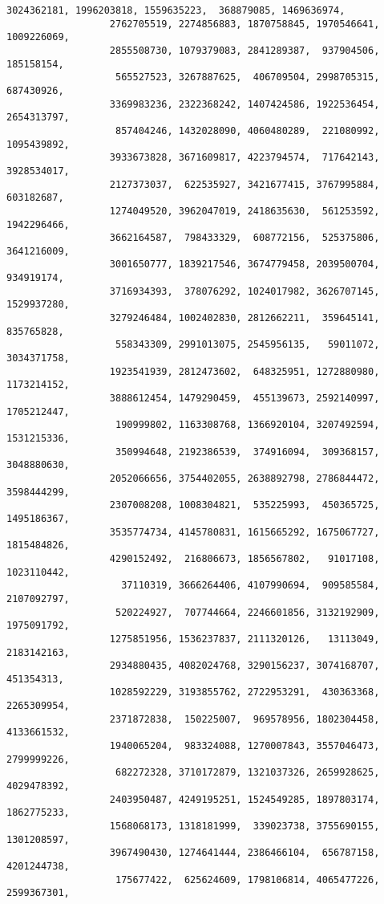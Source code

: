 \documentclass[11pt]{article}
\begin{document}
\begin{Verbatim}[commandchars=\\\{\}]
                  3024362181, 1996203818, 1559635223,  368879085, 1469636974,
                  2762705519, 2274856883, 1870758845, 1970546641, 1009226069,
                  2855508730, 1079379083, 2841289387,  937904506,  185158154,
                   565527523, 3267887625,  406709504, 2998705315,  687430926,
                  3369983236, 2322368242, 1407424586, 1922536454, 2654313797,
                   857404246, 1432028090, 4060480289,  221080992, 1095439892,
                  3933673828, 3671609817, 4223794574,  717642143, 3928534017,
                  2127373037,  622535927, 3421677415, 3767995884,  603182687,
                  1274049520, 3962047019, 2418635630,  561253592, 1942296466,
                  3662164587,  798433329,  608772156,  525375806, 3641216009,
                  3001650777, 1839217546, 3674779458, 2039500704,  934919174,
                  3716934393,  378076292, 1024017982, 3626707145, 1529937280,
                  3279246484, 1002402830, 2812662211,  359645141,  835765828,
                   558343309, 2991013075, 2545956135,   59011072, 3034371758,
                  1923541939, 2812473602,  648325951, 1272880980, 1173214152,
                  3888612454, 1479290459,  455139673, 2592140997, 1705212447,
                   190999802, 1163308768, 1366920104, 3207492594, 1531215336,
                   350994648, 2192386539,  374916094,  309368157, 3048880630,
                  2052066656, 3754402055, 2638892798, 2786844472, 3598444299,
                  2307008208, 1008304821,  535225993,  450365725, 1495186367,
                  3535774734, 4145780831, 1615665292, 1675067727, 1815484826,
                  4290152492,  216806673, 1856567802,   91017108, 1023110442,
                    37110319, 3666264406, 4107990694,  909585584, 2107092797,
                   520224927,  707744664, 2246601856, 3132192909, 1975091792,
                  1275851956, 1536237837, 2111320126,   13113049, 2183142163,
                  2934880435, 4082024768, 3290156237, 3074168707,  451354313,
                  1028592229, 3193855762, 2722953291,  430363368, 2265309954,
                  2371872838,  150225007,  969578956, 1802304458, 4133661532,
                  1940065204,  983324088, 1270007843, 3557046473, 2799999226,
                   682272328, 3710172879, 1321037326, 2659928625, 4029478392,
                  2403950487, 4249195251, 1524549285, 1897803174, 1862775233,
                  1568068173, 1318181999,  339023738, 3755690155, 1301208597,
                  3967490430, 1274641444, 2386466104,  656787158, 4201244738,
                   175677422,  625624609, 1798106814, 4065477226, 2599367301,

\end{Verbatim}
\end{document}
